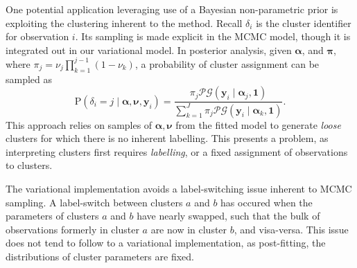 One potential application leveraging use of a Bayesian non-parametric prior is 
    exploiting the clustering inherent to the method. Recall $\delta_i$ is the 
    cluster identifier for observation $i$.  Its sampling is made explicit in
    the MCMC model, though it is integrated out in our variational model. In
    posterior analysis, given $\bm{\alpha}$, and $\bm{\pi}$, where 
    $\pi_j = \nu_j\prod_{k = 1}^{j-1}(1 - \nu_k)$, a probability of cluster 
    assignment can be sampled as
    \begin{equation}
        \label{eqn:clusterprob}
        \text{P}\left(\delta_i = j\mid\bm{\alpha},\bm{\nu},\bm{y}_i\right) 
            = \frac{\pi_j\mathcal{PG}(\bm{y}_i\mid\bm{\alpha}_j,\bm{1})}{
            \sum_{k = 1}^J \pi_j\mathcal{PG}(\bm{y}_i\mid\bm{\alpha}_k,\bm{1})}.
    \end{equation}
    This approach relies on samples of $\bm{\alpha},\bm{\nu}$ from the fitted
    model to generate \emph{loose} clusters for which there is no inherent 
    labelling.  This presents a problem, as interpreting clusters first requires
    \emph{labelling}, or a fixed assignment of observations to clusters.

The variational implementation avoids a label-switching issue inherent to 
    MCMC sampling.  A label-switch between clusters $a$ and $b$ has occured when
    the parameters of clusters $a$ and $b$ have nearly swapped, such that the
    bulk of observations formerly in cluster $a$ are now in cluster $b$, and 
    visa-versa.  This issue does not tend to follow to a variational 
    implementation, as post-fitting, the distributions of cluster parameters are 
    fixed.

